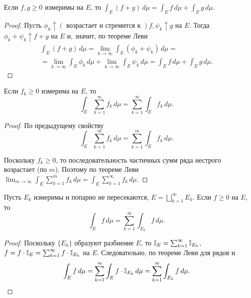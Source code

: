 \begin{property}[аддитивность]
    Если $f, g \ge 0$ измеримы на $E$, то $\int_E (f + g) \, d\mu = \int_E f \, d\mu + \int_E g \, d\mu$.

    \begin{proof}
        Пусть $\phi_k \uparrow (\text{ возрастает и стремится к }) f, \psi_k \uparrow g$ на $E$. Тогда $\phi_k + \psi_k \uparrow f + g$ на $E$ и, значит, по теореме Леви
        \begin{gather*}
            \int_E (f + g) \, d\mu = \lim_{k \rightarrow \infty} \int_E (\phi_k + \psi_k) \, d\mu =\\= \lim_{k \rightarrow \infty} \int_E \phi_k \, d\mu + \lim_{k \rightarrow \infty} \int_E \psi_k \, d\mu = \int_E f \, d\mu + \int_E g \, d\mu.
        \end{gather*}
    \end{proof}
\end{property}

\begin{corollary}
    Если $f_k \ge 0$ измерима на $E$, то
    \[
        \int_E \sum_{k = 1}^\infty f_k \, d\mu = \sum_{k = 1}^\infty \int_E f_k \, d\mu.
    \]

    \begin{proof}
        По предыдущему свойству
        \[
            \int_E \sum_{k = 1}^m f_k \, d\mu = \sum_{k = 1}^m \int_E f_k \, d\mu.
        \]

        Поскольку $f_k \ge 0$, то последовательность частичных сумм ряда нестрого возрастает (по $m$). Поэтому по теореме Леви $\lim_{m \rightarrow \infty} \int_E \sum_{k = 1}^m f_k \, d\mu = \int_E \sum_{k = 1}^\infty f_k \, d\mu$.
    \end{proof}
\end{corollary}

\begin{theorem}
    Пусть $E_k$ измеримы и попарно не пересекаются, $E = \bigsqcup_{k = 1}^\infty E_k$. Если $f \ge 0$ на $E$, то
    \[
        \int_E f \, d\mu = \sum_{k = 1}^\infty \int_{E_k} f \, d\mu.
    \]

    \begin{proof}
        Поскольку $\{E_k\}$ образуют разбиение $E$, то $\mathbb{I}_E = \sum_{k = 1}^\infty \mathbb{I}_{E_k}$, $f = f \cdot \mathbb{I}_E = \sum_{k = 1}^\infty f \cdot \mathbb{I}_{E_k}$ на $E$. Следовательно, по теореме Леви для рядов и
        \[
            \int_E f \, d\mu = \sum_{k = 1}^\infty \int_E f \cdot \mathbb{I}_{E_k} \, d\mu = \sum_{k = 1}^\infty \int_{E_k} f \, d\mu.
        \]
    \end{proof}
\end{theorem}

